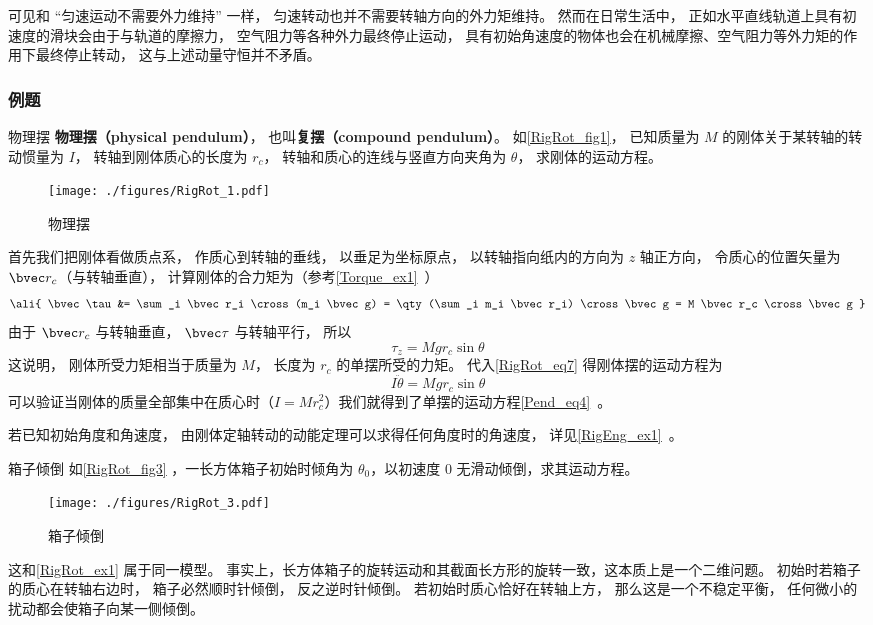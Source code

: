 可见和 “匀速运动不需要外力维持” 一样， 匀速转动也并不需要转轴方向的外力矩维持。 然而在日常生活中， 正如水平直线轨道上具有初速度的滑块会由于与轨道的摩擦力， 空气阻力等各种外力最终停止运动， 具有初始角速度的物体也会在机械摩擦、空气阻力等外力矩的作用下最终停止转动， 这与上述动量守恒并不矛盾。

\subsubsection{例题}

\begin{example}{物理摆}\label{RigRot_ex1}
\textbf{物理摆（physical pendulum）}， 也叫\textbf{复摆（compound pendulum）}。 如\autoref{RigRot_fig1}， 已知质量为 $M$ 的刚体关于某转轴的转动惯量为 $I$， 转轴到刚体质心的长度为 $r_c$， 转轴和质心的连线与竖直方向夹角为 $\theta$， 求刚体的运动方程。
\begin{figure}[ht]
\centering
\texttt{[image: ./figures/RigRot\_1.pdf]}
\caption{物理摆} \label{RigRot_fig1}
\end{figure}

首先我们把刚体看做质点系， 作质心到转轴的垂线， 以垂足为坐标原点， 以转轴指向纸内的方向为 $z$ 轴正方向， 令质心的位置矢量为 $\bvec r_c$（与转轴垂直）， 计算刚体的合力矩为（参考\autoref{Torque_ex1}~）
\begin{equation}\label{RigRot_eq14}\ali{
\bvec \tau &= \sum_i \bvec r_i \cross (m_i \bvec g)
= \qty(\sum_i m_i \bvec r_i) \cross \bvec g
= M \bvec r_c \cross \bvec g
}\end{equation}
由于 $\bvec r_c$ 与转轴垂直， $\bvec \tau$ 与转轴平行， 所以
\begin{equation}
\tau_z = Mg r_c \sin\theta
\end{equation}
这说明， 刚体所受力矩相当于质量为 $M$， 长度为 $r_c$ 的单摆所受的力矩。 代入\autoref{RigRot_eq7} 得刚体摆的运动方程为
\begin{equation}
I\ddot \theta = Mg r_c \sin\theta
\end{equation}
可以验证当刚体的质量全部集中在质心时（$I = Mr_c^2$）我们就得到了单摆的运动方程\autoref{Pend_eq4}~。

若已知初始角度和角速度， 由刚体定轴转动的动能定理可以求得任何角度时的角速度， 详见\autoref{RigEng_ex1}~。
\end{example}

\begin{example}{箱子倾倒}
如\autoref{RigRot_fig3} ，一长方体箱子初始时倾角为 $\theta_0$，以初速度 0 无滑动倾倒，求其运动方程。
\begin{figure}[ht]
\centering
\texttt{[image: ./figures/RigRot\_3.pdf]}
\caption{箱子倾倒} \label{RigRot_fig3}
\end{figure}
这和\autoref{RigRot_ex1} 属于同一模型。 事实上，长方体箱子的旋转运动和其截面长方形的旋转一致，这本质上是一个二维问题。 初始时若箱子的质心在转轴右边时， 箱子必然顺时针倾倒， 反之逆时针倾倒。 若初始时质心恰好在转轴上方， 那么这是一个不稳定平衡， 任何微小的扰动都会使箱子向某一侧倾倒。
\end{example}

